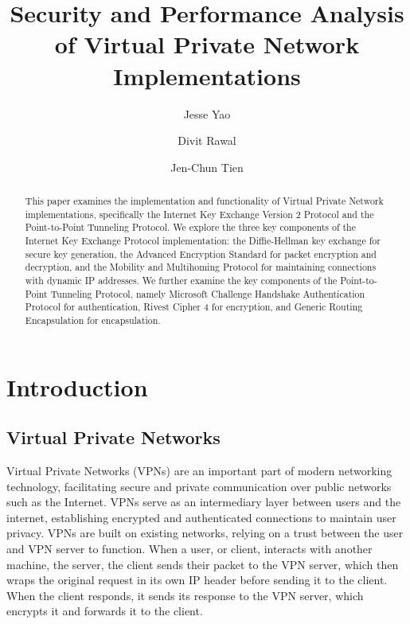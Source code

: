 \documentclass[runningheads]{llncs}
\begin{document}
\title{Security and Performance Analysis of Virtual Private Network Implementations}

\author{Jesse Yao \and Divit Rawal \and Jen-Chun Tien}


\maketitle

\begin{abstract}
This paper examines the implementation and functionality of Virtual Private Network implementations, specifically the Internet Key Exchange Version 2 Protocol and the Point-to-Point Tunneling Protocol. We explore the three key components of the Internet Key Exchange Protocol implementation: the Diffie-Hellman key exchange for secure key generation, the Advanced Encryption Standard for packet encryption and decryption, and the Mobility and Multihoming Protocol for maintaining connections with dynamic IP addresses. We further examine the key components of the Point-to-Point Tunneling Protocol, namely Microsoft Challenge Handshake Authentication Protocol for authentication, Rivest Cipher 4 for encryption, and Generic Routing Encapsulation for encapsulation.
\end{abstract}

\section{Introduction}
\subsection{Virtual Private Networks}
Virtual Private Networks (VPNs) are an important part of  modern networking technology, facilitating secure and private communication over public networks such as the Internet. VPNs serve as an intermediary layer between users and the internet, establishing encrypted and authenticated connections to maintain user privacy. VPNs are built on existing networks, relying on a trust between the user and VPN server to function. When a user, or client, interacts with another machine, the server, the client sends their packet to the VPN server, which then wraps the original request in its own IP header before sending it to the client. When the client responds, it sends its response to the VPN server, which encrypts it and forwards it to the client.
\end{document}
